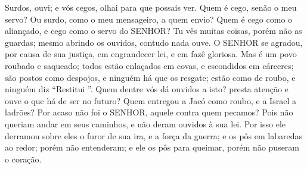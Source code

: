 {Surdos, ouvi; e vós cegos, olhai para que possais ver.
Quem é cego, senão o meu servo? Ou surdo, como o meu mensageiro, a quem envio? Quem é cego como o aliançado,
 e cego como o servo do SENHOR?
Tu vês muitas coisas, porém não as guardas; mesmo abrindo os ouvidos, contudo nada ouve.
O SENHOR se agradou, por causa de sua justiça, em engrandecer
{} lei, e em fazê
{} gloriosa.
Mas
{} é um povo roubado e saqueado; todos estão enlaçados em covas, e escondidos em cárceres; são postos como despojos, e ninguém há que os resgate; estão como
{} de roubo, e ninguém diz “Restitui
{} ”.
Quem dentre vós dá ouvidos a isto?
{} presta atenção e ouve o que há de ser no futuro?
Quem entregou a Jacó como roubo, e a Israel a ladrões? Por acaso não foi o SENHOR, aquele contra quem pecamos? Pois não queriam andar em seus caminhos, e não deram ouvidos à sua lei.
Por isso ele derramou sobre eles o furor de sua ira, e a força da guerra; e os pôs em labaredas ao redor; porém
{} não entenderam; e ele os pôs para queimar, porém
{} não puseram
{} o coração.

}

